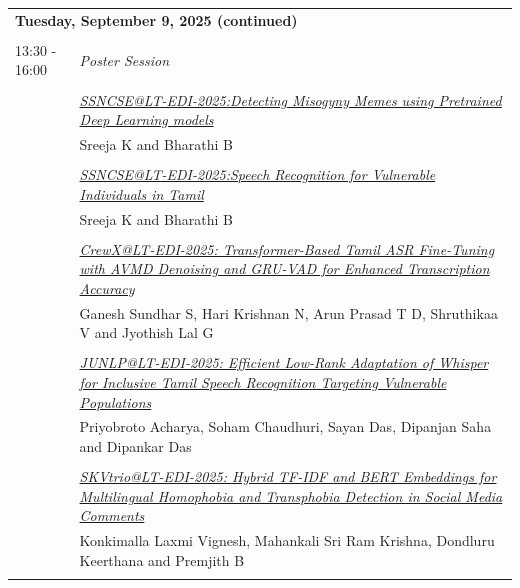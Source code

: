 \documentclass[11pt,oneside]{book}
\begin{document}
    \newpage
          \begin{tabular}{p{24mm}p{124mm}}
    \multicolumn{2}{l}{\bf Tuesday, September 9, 2025 (continued)} \\\\
                13:30 - 16:00 & \emph{Poster Session}\\\\
      
                
                      & \hyperlink{page.1}{\emph{SSNCSE@LT-EDI-2025:Detecting Misogyny Memes using Pretrained Deep Learning models}}\\
        & Sreeja K\index{K} and Bharathi B\index{B}\\\\
                
                      & \hyperlink{page.6}{\emph{SSNCSE@LT-EDI-2025:Speech Recognition for Vulnerable Individuals in Tamil}}\\
        & Sreeja K\index{K} and Bharathi B\index{B}\\\\
                
                      & \hyperlink{page.11}{\emph{CrewX@LT-EDI-2025: Transformer-Based Tamil ASR Fine-Tuning with AVMD Denoising and GRU-VAD for Enhanced Transcription Accuracy}}\\
        & Ganesh Sundhar S\index{S}, Hari Krishnan N\index{N}, Arun Prasad T D\index{D}, Shruthikaa V\index{V} and Jyothish Lal G\index{G}\\\\
                
                      & \hyperlink{page.17}{\emph{JUNLP@LT-EDI-2025: Efficient Low-Rank Adaptation of Whisper for Inclusive Tamil Speech Recognition Targeting Vulnerable Populations}}\\
        & Priyobroto Acharya\index{Acharya}, Soham Chaudhuri\index{Chaudhuri}, Sayan Das\index{Das}, Dipanjan Saha\index{Saha} and Dipankar Das\index{Das}\\\\
                
                      & \hyperlink{page.26}{\emph{SKVtrio@LT-EDI-2025: Hybrid TF-IDF and BERT Embeddings for  Multilingual Homophobia and Transphobia Detection in Social Media  Comments}}\\
        & Konkimalla Laxmi Vignesh\index{Vignesh}, Mahankali Sri Ram Krishna\index{Krishna}, Dondluru Keerthana\index{Keerthana} and Premjith B\index{B}\\\\
                

\end{tabular}
\end{document}
